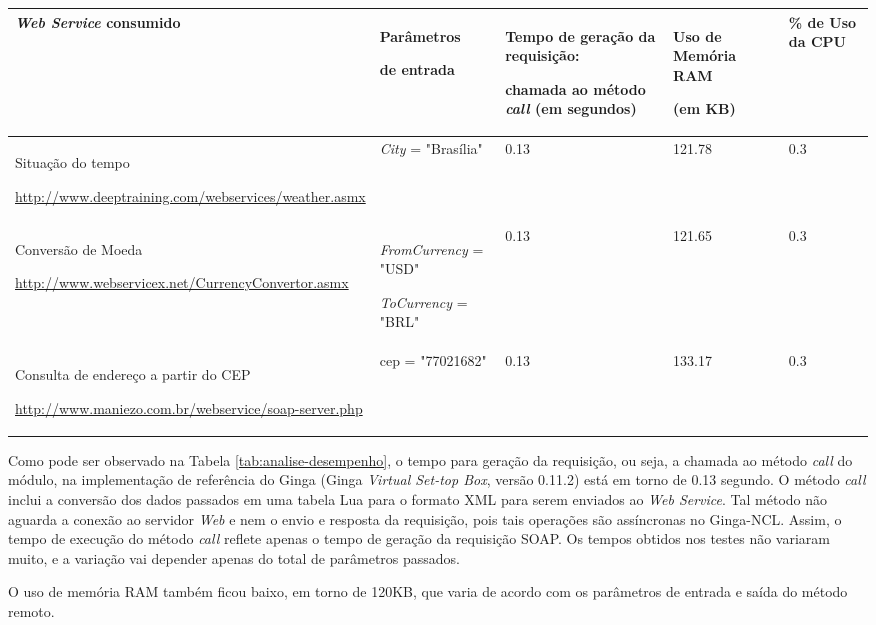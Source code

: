 \begin{center}
\scriptsize{
	\begin{tabular}{|p{4.5cm}|p{2.8cm}|p{2.8cm}|p{1.2cm}|p{1.2cm}|} %
  \hline
		\textbf{\textit{Web Service} consumido} & 
		\textbf{Parâmetros} \par\textbf{de entrada} &
		\textbf{Tempo de geração da requisição:}\par\textbf{chamada ao método \textit{call}} \textbf{(em segundos)} & 
		\textbf{Uso de Memória RAM}\par\textbf{(em KB)} &
		\textbf{\% de Uso da CPU}\\
  \hline
		Situação do tempo\par \url{http://www.deeptraining.com/webservices/weather.asmx} & 
		\textit{City} = "Brasília" & 0.13 & 121.78 & 0.3 \\
  \hline
		Conversão de Moeda\par
		\url{http://www.webservicex.net/CurrencyConvertor.asmx} &
		\textit{FromCurrency} = "USD"\par        
    \textit{ToCurrency} = "BRL" & 
    0.13 & 121.65 & 0.3 \\  
  \hline
		Consulta de endereço a partir do CEP\par
		\url{http://www.maniezo.com.br/webservice/soap-server.php} &
    cep = "77021682" & 
    0.13 & 133.17 & 0.3 \\  
	\hline
	\end{tabular}
	\label{tab:analise-desempenho}
}
\end{center}

Como pode ser observado na Tabela \ref{tab:analise-desempenho},
o tempo para geração da requisição, ou seja, a chamada ao método \textit{call}
do módulo, na implementação de referência do Ginga (Ginga \textit{Virtual Set-top Box}, versão 0.11.2)
está em torno de 0.13 segundo. O método \textit{call} inclui a conversão dos dados passados em uma tabela Lua
para o formato XML para serem enviados ao \textit{Web Service}. Tal método não aguarda 
a conexão ao servidor \textit{Web} e nem o envio e resposta da requisição, pois tais
operações são assíncronas no Ginga-NCL. Assim, o tempo de execução
do método \textit{call} reflete apenas o tempo de geração da requisição SOAP. 
Os tempos obtidos nos testes não variaram muito,
e a variação vai depender apenas do total de parâmetros passados.

O uso de memória RAM também ficou baixo, em torno de 120KB, que varia de acordo com
os parâmetros de entrada e saída do método remoto.

